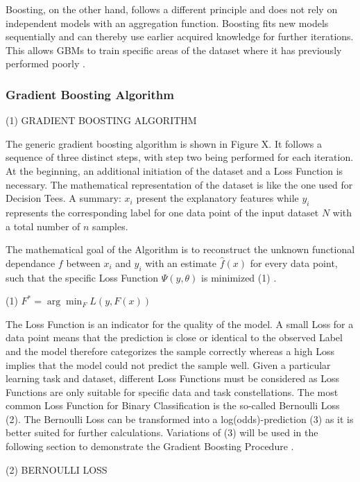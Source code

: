 Boosting, on the other hand, follows a different principle and does not rely on independent 
models with an aggregation function. Boosting fits new models sequentially and can thereby use 
earlier acquired knowledge for further iterations. This allows GBMs to train specific areas of 
the dataset where it has previously performed poorly \cite[p.345f]{James2021}.  

\subsubsection{Gradient Boosting Algorithm}

(1) GRADIENT BOOSTING ALGORITHM 

The generic gradient boosting algorithm is shown in Figure X. It follows a sequence of three 
distinct steps, with step two being performed for each iteration. At the beginning, an 
additional initiation of the dataset and a Loss Function is necessary. The mathematical 
representation of the dataset is like the one used for Decision Tees. A summary: \(x_{i}\) present the 
explanatory features while \(y_{i}\) represents the corresponding label for one data point of the input 
dataset \(N\) with a total number of \(n\) samples. 

The mathematical goal of the Algorithm is to reconstruct the unknown functional dependance \(f\) 
between \(x_{i}\) and \(y_{i}\) with an estimate \(\hat{f} (x)\) for every data point, such that the specific Loss 
Function \(\Psi (y,\theta )\) is minimized (1) \cite[p.1189]{Friedman_2001} \cite[2.1]{Natekin2013}. 

(1) \(F^{*} = \arg \min_{F} L(y, F(x))\)


The Loss Function is an indicator for the quality of the model. A small Loss for a data point 
means that the prediction is close or identical to the observed Label and the model therefore 
categorizes the sample correctly whereas a high Loss implies that the model could not predict 
the sample well. Given a particular learning task and dataset, different Loss Functions must 
be considered as Loss Functions are only suitable for specific data and task constellations. The most common 
Loss Function for Binary Classification is the so-called Bernoulli Loss (2). The Bernoulli Loss 
can be transformed into a log(odds)-prediction (3) as it is better suited for further calculations. 
Variations of (3) will be used in the following section to demonstrate the Gradient Boosting 
Procedure \cite[3.1]{Natekin2013}. 

(2) BERNOULLI LOSS 

